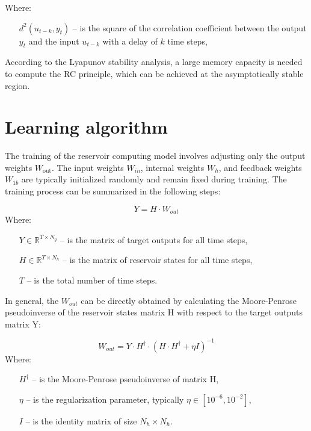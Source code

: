\documentclass[11pt, oneside]{article}
\begin{document}
Where:
\begin{itemize}[noitemsep, leftmargin=4cm, label={}]
    \item [$d^2(u_{t-k}, y_t)$] -- is the square of the correlation coefficient between the output $y_t$ and the input $u_{t-k }$ with a delay of $k$ time steps,
\end{itemize}

According to the Lyapunov stability analysis, a large memory capacity is needed to compute the RC principle, which can be achieved at the asymptotically stable region.


\section{Learning algorithm}
The training of the reservoir computing model involves adjusting only the output weights $W_{\mathrm{out}}$. The input weights $W_{in}$, internal weights $W_h$, and feedback weights $W_{1b}$ are typically initialized randomly and remain fixed during training. The training process can be summarized in the following steps:

\begin{equation}
    Y = H \cdot W_{out}
\end{equation}
Where:
\begin{itemize}[noitemsep, leftmargin=4cm, label={}]
    \item [$Y \in \mathbb{R}^{T \times N_y}$] -- is the matrix of target outputs for all time steps,
    \item [$H \in \mathbb{R}^{T \times N_h}$] -- is the matrix of reservoir states for all time steps,
    \item [$T$] -- is the total number of time steps.
\end{itemize}

In general, the $W_{out}$ can be directly obtained by calculating the Moore-Penrose pseudoinverse of the reservoir states matrix H with respect to the target outputs matrix Y:

\begin{equation}
    W_{out} = Y \cdot H^{\dagger} \cdot (H \cdot H^{\dagger} + \eta I)^{-1}
\end{equation}
Where: 
\begin{itemize}[noitemsep, leftmargin=2cm, label={}]
    \item [$H^{\dagger}$] -- is the Moore-Penrose pseudoinverse of matrix H,
    \item [$\eta$] -- is the regularization parameter, typically $\eta \in [10^{-6}, 10^{-2}]$,
    \item [$I$] -- is the identity matrix of size $N_h \times N_h$.
\end{itemize}
\end{document}
